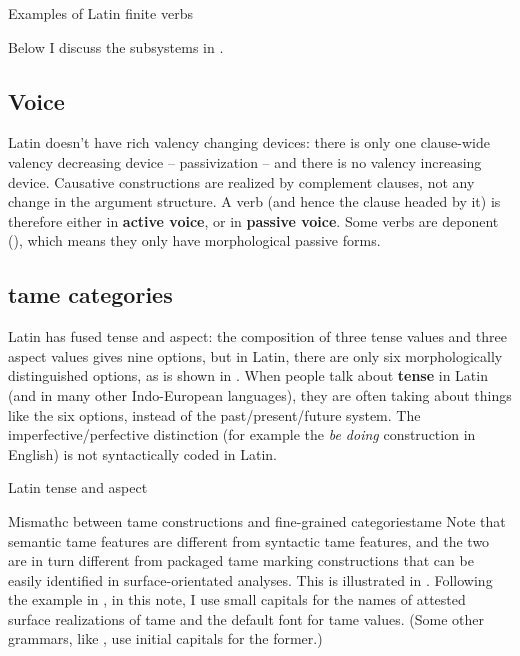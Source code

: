 \documentclass[a4paper, oneside]{report}
\newcommand*{\concept}[1]{\textbf{#1}}
\newcommand{\form}[1]{\emph{#1}}
\begin{document}
\begin{sidewaystable}
    \centering
    \caption{Examples of Latin finite verbs}
    \label{tbl:latin-finite-verbs}
        
\end{sidewaystable}

Below I discuss the subsystems in .

\subsection{Voice}

Latin doesn't have rich valency changing devices:
there is only one clause-wide valency decreasing device -- passivization -- 
and there is no valency increasing device.
Causative constructions are realized by complement clauses,
not any change in the argument structure.
A verb (and hence the clause headed by it) is therefore either in \concept{active voice},
or in \concept{passive voice}.
Some verbs are deponent (),
which means they only have morphological passive forms.

\subsection{\acs{tame} categories}\label{sec:verb-inflection.finite-template.tame}

Latin has fused tense and aspect:
the composition of three tense values and three aspect values 
gives nine options,
but in Latin, there are only six morphologically distinguished options,
as is shown in . 
When people talk about \concept{tense} in Latin (and in many other Indo-European languages),
they are often taking about things like the six options,
instead of the past/present/future system.
The imperfective/perfective distinction 
(for example the \form{be doing} construction in English)
is not syntactically coded in Latin.

\begin{table}[H]
    \caption{Latin tense and aspect}
    \label{tbl:latin-tense-aspect}
    \centering
        
\end{table}

\begin{infobox}{Mismathc between \ac{tame} constructions and fine-grained categories}{tame}
    Note that semantic \ac{tame} features are different from 
    syntactic \ac{tame} features,
    and the two are in turn different from packaged \ac{tame} marking constructions
    that can be easily identified in surface-orientated analyses.
    This is illustrated in .
    Following the example in \citet{grimm2021grammar},
    in this note, I use small capitals for the names of attested surface realizations of \ac{tame}
    and the default font for \ac{tame} values.
    (Some other grammars, like \citet{jacques2021grammar,friesen2017grammar}, 
    use initial capitals for the former.)
\end{infobox}
\end{document}
